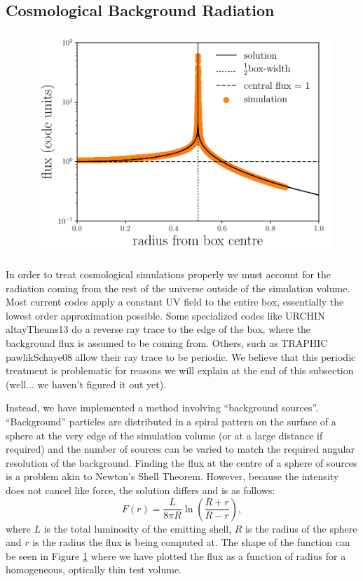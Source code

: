\documentclass[fleq,usenatbib]{mnras}
\begin{document}
\subsection{Cosmological Background Radiation}
\begin{figure}
\includegraphics[width=1\linewidth]{Figures/cosmofield.pdf}
\caption{}
\label{fig:cosmof}
\end{figure}
In order to treat cosmological simulations properly we must account for the 
radiation coming from the rest of the universe outside of the simulation 
volume. Most current codes apply a constant UV field to the entire box, 
essentially the lowest order approximation possible. Some specialized codes 
like URCHIN {altayTheuns13} do a reverse ray trace to the edge of the 
box, where the background flux is assumed to be coming from. Others, such as 
TRAPHIC {pawlikSchaye08} allow their ray trace to be periodic. We believe
that this periodic treatment is problematic for reasons we will explain at the
end of this subsection (well... we haven't figured it out yet). 

Instead, we have implemented a method involving ``background sources''. 
``Background'' particles are distributed in a spiral pattern on the surface of 
a sphere at the very edge of the simulation volume (or at a large distance if 
required) and the number of sources can be varied to match the required 
angular resolution  of the background. Finding the flux at the centre of a 
sphere of sources is a problem akin to Newton's Shell Theorem. However, 
because the intensity does not cancel like force, the solution differs and is 
as follows:
\begin{equation}
\label{eq:cosmof}
F(r) = \frac{L}{8\pi R} \ln \left(\frac{R+r}{R-r}\right),
\end{equation}
where $L$ is the total luminosity of the emitting shell, $R$ is the radius of 
the sphere and $r$ is the radius the flux is being computed at. The shape of 
the function can be seen in Figure \ref{fig:cosmof} where we have plotted the 
flux as a function of radius for a homogeneous, optically thin test volume.
\end{document}
